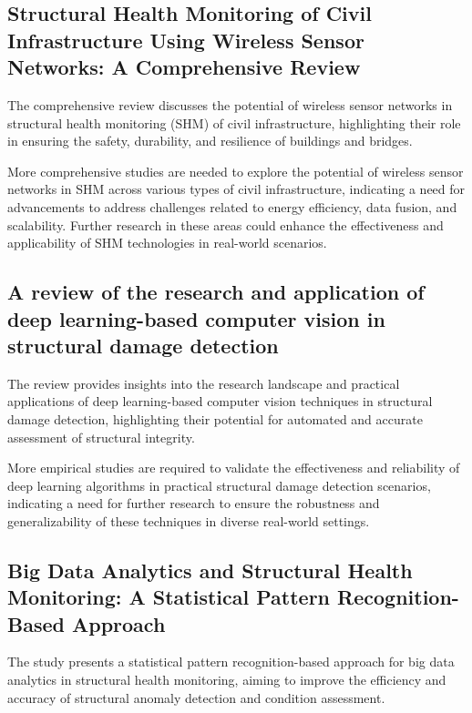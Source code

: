 \documentclass[journal, a4paper]{IEEEtran}
\begin{document}
\subsection{Structural Health Monitoring of Civil Infrastructure Using Wireless Sensor Networks: A Comprehensive Review}
The comprehensive review discusses the potential of wireless sensor networks in structural health monitoring (SHM) of civil infrastructure, highlighting their role in ensuring the safety, durability, and resilience of buildings and bridges. 

\begin{description}[style=standard, font=\normalfont]
  \item[Research gap:] More comprehensive studies are needed to explore the potential of wireless sensor networks in SHM across various types of civil infrastructure, indicating a need for advancements to address challenges related to energy efficiency, data fusion, and scalability. Further research in these areas could enhance the effectiveness and applicability of SHM technologies in real-world scenarios.
\end{description}


\subsection{A review of the research and application of deep learning-based computer vision in structural damage detection}
The review provides insights into the research landscape and practical applications of deep learning-based computer vision techniques in structural damage detection, highlighting their potential for automated and accurate assessment of structural integrity. 

\begin{description}[style=standard, font=\normalfont]
  \item[Research gap:] More empirical studies are required to validate the effectiveness and reliability of deep learning algorithms in practical structural damage detection scenarios, indicating a need for further research to ensure the robustness and generalizability of these techniques in diverse real-world settings.
\end{description}


\subsection{Big Data Analytics and Structural Health Monitoring: A Statistical Pattern Recognition-Based Approach}
The study presents a statistical pattern recognition-based approach for big data analytics in structural health monitoring, aiming to improve the efficiency and accuracy of structural anomaly detection and condition assessment. 
\end{document}
